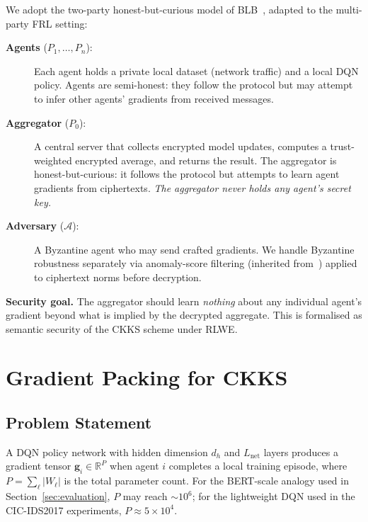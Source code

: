\documentclass[letterpaper,journal]{IEEEtran}
\newcommand{\RR}{\mathbb{R}}
\begin{document}
We adopt the two-party honest-but-curious model of BLB~\cite{blb2025},
adapted to the multi-party FRL setting:

\begin{description}
  \item[\textbf{Agents} ($P_1, \ldots, P_n$):] Each agent holds a private
        local dataset (network traffic) and a local DQN policy.
        Agents are semi-honest: they follow the protocol but may attempt to
        infer other agents' gradients from received messages.
  \item[\textbf{Aggregator} ($P_0$):] A central server that collects encrypted
        model updates, computes a trust-weighted encrypted average, and returns
        the result.
        The aggregator is honest-but-curious: it follows the protocol but
        attempts to learn agent gradients from ciphertexts.
        \emph{The aggregator never holds any agent's secret key.}
  \item[\textbf{Adversary} ($\mathcal{A}$):] A Byzantine agent who may send
        crafted gradients.
        We handle Byzantine robustness separately via anomaly-score filtering
        (inherited from~\cite{frlconf2026}) applied to ciphertext norms before
        decryption.
\end{description}

\textbf{Security goal.}
The aggregator should learn \emph{nothing} about any individual agent's
gradient beyond what is implied by the decrypted aggregate.
This is formalised as semantic security of the CKKS scheme under RLWE.

\section{Gradient Packing for CKKS}\label{sec:packing}

\subsection{Problem Statement}

A DQN policy network with hidden dimension $d_h$ and $L_{\text{net}}$ layers
produces a gradient tensor $\mathbf{g}_i \in \RR^P$ when agent $i$ completes a
local training episode, where $P = \sum_\ell |W_\ell|$ is the total parameter
count.
For the BERT-scale analogy used in Section~\ref{sec:evaluation}, $P$ may reach
$\sim 10^6$; for the lightweight DQN used in the CIC-IDS2017 experiments,
$P \approx 5 \times 10^4$.
\end{document}
